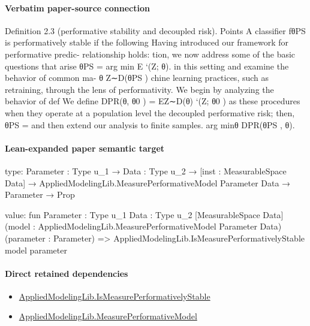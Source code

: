 \documentclass[10pt]{article}
\begin{document}
\paragraph{Verbatim paper-source connection}
\begin{ReviewVerbatim}
Deﬁnition 2.3 (performative stability and decoupled risk).              Points
A classiﬁer fθPS is performatively stable if the following           Having introduced our framework for performative predic-
relationship holds:                                                  tion, we now address some of the basic questions that arise
             θPS = arg min          E        `(Z; θ).                in this setting and examine the behavior of common ma-
                        θ        Z∼D(θPS )                           chine learning practices, such as retraining, through the lens
                                                                     of performativity. We begin by analyzing the behavior of
                                  def
We deﬁne DPR(θ, θ0 )     =    EZ∼D(θ) `(Z; θ0 ) as                   these procedures when they operate at a population level
the decoupled performative risk; then, θPS      =                    and then extend our analysis to ﬁnite samples.
arg minθ DPR(θPS , θ).
\end{ReviewVerbatim}



\paragraph{Lean-expanded paper semantic target}
\begin{ReviewVerbatim}
type:
{Parameter : Type u_1} →
  {Data : Type u_2} →
    [inst : MeasurableSpace Data] → AppliedModelingLib.MeasurePerformativeModel Parameter Data → Parameter → Prop

value:
fun {Parameter : Type u_1} {Data : Type u_2} [MeasurableSpace Data]
    (model : AppliedModelingLib.MeasurePerformativeModel Parameter Data) (parameter : Parameter) =>
  AppliedModelingLib.IsMeasurePerformativelyStable model parameter
\end{ReviewVerbatim}

\paragraph{Direct retained dependencies}
\begin{itemize}\raggedright
\item \hyperlink{governing-declaration-e97175bd0a346777}{Applied\allowbreak{}Modeling\allowbreak{}Lib.\allowbreak{}Is\allowbreak{}Measure\allowbreak{}Performatively\allowbreak{}Stable}
\item \hyperlink{library-prerequisite-96553d4fbb82f1ac}{Applied\allowbreak{}Modeling\allowbreak{}Lib.\allowbreak{}Measure\allowbreak{}Performative\allowbreak{}Model}
\end{itemize}
\end{document}
